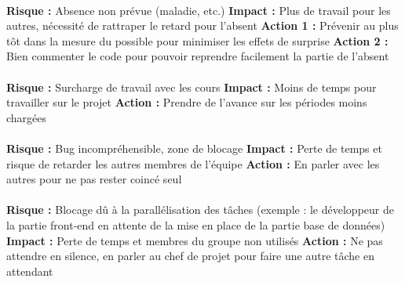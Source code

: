 \paragraph{}

\textbf{Risque : } Absence non prévue (maladie, etc.)
\newline
\textbf{Impact : } Plus de travail pour les autres, nécessité de rattraper le retard pour l'absent
\newline
\textbf{Action 1 : } Prévenir au plus tôt dans la mesure du possible pour minimiser les effets de surprise
\newline
\textbf{Action 2 : } Bien commenter le code pour pouvoir reprendre facilement la partie de l’absent

\paragraph{}

\textbf{Risque : } Surcharge de travail avec les cours
\newline
\textbf{Impact : } Moins de temps pour travailler sur le projet
\newline
\textbf{Action : } Prendre de l’avance sur les périodes moins chargées

\paragraph{}

\textbf{Risque : } Bug incompréhensible, zone de blocage
\newline
\textbf{Impact : } Perte de temps et risque de retarder les autres membres de l’équipe
\newline
\textbf{Action : } En parler avec les autres pour ne pas rester coincé seul

\paragraph{}

\textbf{Risque : } Blocage dû à la parallélisation des tâches (exemple : le développeur de la partie
front-end en attente de la mise en place de la partie base de données)
\newline
\textbf{Impact : } Perte de temps et membres du groupe non utilisés
\newline
\textbf{Action : } Ne pas attendre en silence, en parler au chef de projet pour faire une autre tâche
en attendant

\paragraph{}

